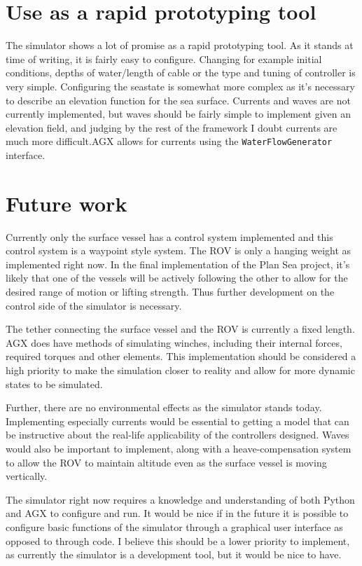 \section{Use as a rapid prototyping tool}
The simulator shows a lot of promise as a rapid prototyping tool. As it stands at time of writing, it is fairly easy to configure. Changing for example initial conditions, depths of water/length of cable or the type and tuning of controller is very simple. Configuring the seastate is somewhat more complex as it's necessary to describe an elevation function for the sea surface. Currents and waves are not currently implemented, but waves should be fairly simple to implement given an elevation field, and judging by the rest of the framework I doubt currents are much more difficult.AGX allows for currents using the \texttt{WaterFlowGenerator} interface. 

\section{Future work}
Currently only the surface vessel has a control system implemented and this control system is a waypoint style system. The ROV is only a hanging weight as implemented right now. In the final implementation of the Plan Sea project, it's likely that one of the vessels will be actively following the other to allow for the desired range of motion or lifting strength. Thus further development on the control side of the simulator is necessary. 

The tether connecting the surface vessel and the ROV is currently a fixed length. AGX does have methods of simulating winches, including their internal forces, required torques and other elements. This implementation should be considered a high priority to make the simulation closer to reality and allow for more dynamic states to be simulated. 

Further, there are no environmental effects as the simulator stands today. Implementing especially currents would be essential to getting a model that can be instructive about the real-life applicability of the controllers designed. Waves would also be important to implement, along with a heave-compensation system to allow the ROV to maintain altitude even as the surface vessel is moving vertically. 

The simulator right now requires a knowledge and understanding of both Python and AGX to configure and run. It would be nice if in the future it is possible to configure basic functions of the simulator through a graphical user interface as opposed to through code. I believe this should be a lower priority to implement, as currently the simulator is a development tool, but it would be nice to have. 

